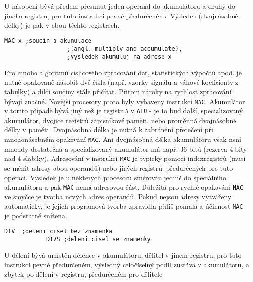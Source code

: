           U násobení bývá předem přesunut jeden operand do akumulátoru a druhý do jiného registru, 
          pro tuto instrukci pevně předurčeného. Výsledek (dvojnásobné délky) je pak v obou těchto 
          registrech.
          
          \begin{lstlisting}[gobble=10]
            MAC x ;soucin a akumulace 
                  ;(angl. multiply and accumulate), 
                  ;vysledek akumuluj na adrese x
          \end{lstlisting}
         
          Pro mnoho algoritmů číslicového zpracování dat, statistických výpočtů apod. je nutné 
          opakovaně násobit dvě čísla (např. vzorky signálu a váhové koeficienty z tabulky) a dílčí 
          součiny stále přičítat. Přitom nároky na rychlost zpracování bývají značné. Novější 
          procesory proto byly vybaveny instrukcí \texttt{MAC}. Akumulátor v tomto případě bývá 
          jiný než je registr \texttt{A} v \texttt{ALU} - je to buď další, specializovaný 
          akumulátor, dvojice registrů zápisníkové paměti, nebo proměnná dvojnásobné délky v 
          paměti. Dvojnásobná délka je nutná k zabránění přetečení při mnohonásobném opakování 
          \texttt{MAC}. Ani dvojnásobná délka akumulátoru však není mnohdy dostatečná a 
          specializovaný akumulátor má např. 36 bitů (rezerva 4 bity nad 4 slabiky). Adresování v 
          instrukci \texttt{MAC} je typicky pomocí indexregistrů (musí se měnit adresy obou 
          operandů) nebo jiných registrů, předurčených pro tuto operaci. Výsledek je u některých 
          procesorů směrován jedině do   speciálního akumulátoru a pak \texttt{MAC} nemá adresovou 
          část. Důležitá pro rychlé opakování \texttt{MAC} ve smyčce je tvorba nových adres 
          operandů. Pokud nejsou adresy vytvářeny automaticky, je jejich programová tvorba 
          zpravidla příliš pomalá a účinnost \texttt{MAC} je podstatně snížena.
         
          \begin{lstlisting}[gobble=10]
            DIV  ;deleni cisel bez znamenka
            DIVS ;deleni cisel se znamenky
          \end{lstlisting}
       
          U dělení bývá umístěn dělenec v akumulátoru, dělitel v jiném registru, pro tuto instrukci 
          pevně předurčeném, výsledný celočíselný podíl zůstává v akumulátoru, a zbytek po dělení v 
          registru, předurčeném pro dělitele.
      
